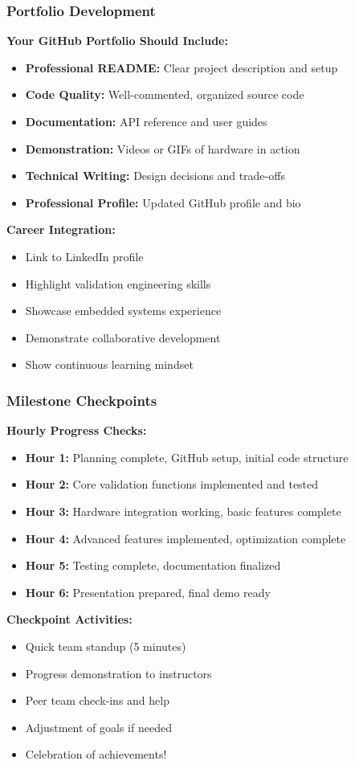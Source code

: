 \documentclass{beamer}
\begin{document}
\begin{frame}
\frametitle{Portfolio Development}
\textbf{Your GitHub Portfolio Should Include:}
\begin{itemize}
    \item \textbf{Professional README:} Clear project description and setup
    \item \textbf{Code Quality:} Well-commented, organized source code
    \item \textbf{Documentation:} API reference and user guides
    \item \textbf{Demonstration:} Videos or GIFs of hardware in action
    \item \textbf{Technical Writing:} Design decisions and trade-offs
    \item \textbf{Professional Profile:} Updated GitHub profile and bio
\end{itemize}

\vspace{0.5cm}
\textbf{Career Integration:}
\begin{itemize}
    \item Link to LinkedIn profile
    \item Highlight validation engineering skills
    \item Showcase embedded systems experience
    \item Demonstrate collaborative development
    \item Show continuous learning mindset
\end{itemize}
\end{frame}

\begin{frame}
\frametitle{Milestone Checkpoints}
\textbf{Hourly Progress Checks:}

\begin{itemize}
    \item \textbf{Hour 1:} Planning complete, GitHub setup, initial code structure
    \item \textbf{Hour 2:} Core validation functions implemented and tested
    \item \textbf{Hour 3:} Hardware integration working, basic features complete
    \item \textbf{Hour 4:} Advanced features implemented, optimization complete
    \item \textbf{Hour 5:} Testing complete, documentation finalized
    \item \textbf{Hour 6:} Presentation prepared, final demo ready
\end{itemize}

\vspace{0.5cm}
\textbf{Checkpoint Activities:}
\begin{itemize}
    \item Quick team standup (5 minutes)
    \item Progress demonstration to instructors
    \item Peer team check-ins and help
    \item Adjustment of goals if needed
    \item Celebration of achievements!
\end{itemize}
\end{frame}
\end{document}
